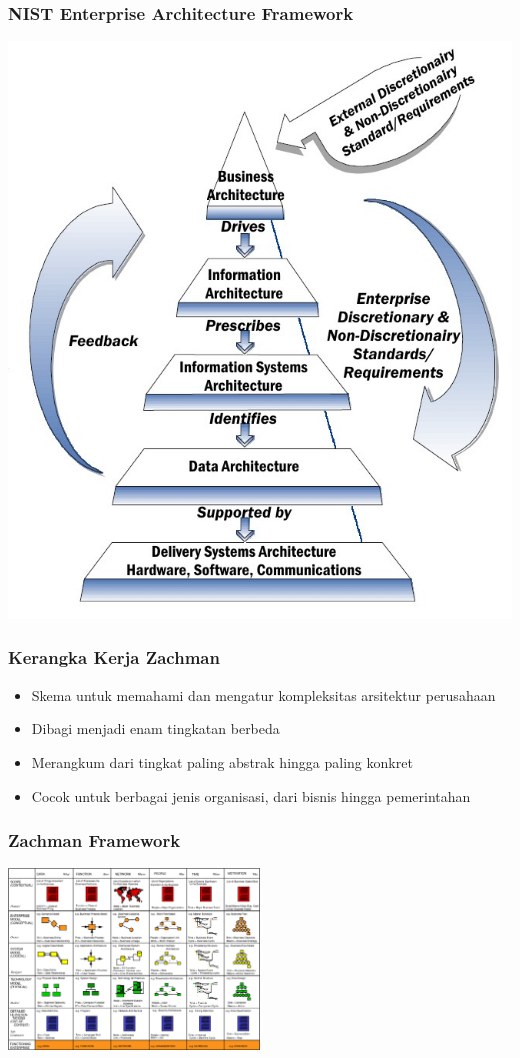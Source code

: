 \documentclass[aspectratio=169, table]{beamer}
\begin{document}
	{
		\begin{frame}
			\frametitle{NIST Enterprise Architecture Framework}
			\begin{center}
				\includegraphics[width=.40\textwidth]{../figures/nist}
			\end{center}
		\end{frame}
	}

	\begin{frame}
		\frametitle{Kerangka Kerja Zachman}
		\begin{itemize}
			\item Skema untuk memahami dan mengatur kompleksitas arsitektur perusahaan
			\item Dibagi menjadi enam tingkatan berbeda
			\item Merangkum dari tingkat paling abstrak hingga paling konkret
			\item Cocok untuk berbagai jenis organisasi, dari bisnis hingga pemerintahan
		\end{itemize}
	\end{frame}

	{
		\begin{frame}
			\frametitle{Zachman Framework}
			\begin{center}
				\includegraphics[width=0.5\textwidth]{../figures/zachman}
			\end{center}
		\end{frame}
	}
\end{document}
